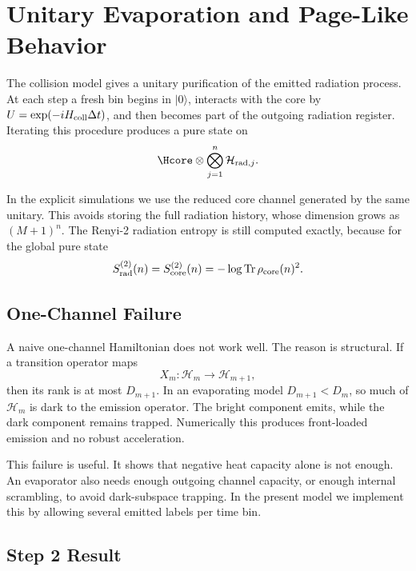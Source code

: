 \section{Unitary Evaporation and Page-Like Behavior}

The collision model gives a unitary purification of the emitted radiation process. At each step a fresh bin begins in $|0\rangle$, interacts with the core by $U=\exp(-iH_{\rm coll}\Delta t)$, and then becomes part of the outgoing radiation register. Iterating this procedure produces a pure state on
\begin{equation}
  \Hcore\otimes \bigotimes_{j=1}^{n}\mathcal{H}_{{\rm rad},j}.
\end{equation}

In the explicit simulations we use the reduced core channel generated by the same unitary. This avoids storing the full radiation history, whose dimension grows as $(M+1)^n$. The Renyi-2 radiation entropy is still computed exactly, because for the global pure state
\begin{equation}
  S^{(2)}_{\rm rad}(n)
  =
  S^{(2)}_{\rm core}(n)
  =
  -\log {\rm Tr}\,\rho_{\rm core}(n)^2.
\end{equation}

\subsection{One-Channel Failure}

A naive one-channel Hamiltonian does not work well. The reason is structural. If a transition operator maps
\begin{equation}
  X_m:\mathcal{H}_m\rightarrow\mathcal{H}_{m+1},
\end{equation}
then its rank is at most $D_{m+1}$. In an evaporating model $D_{m+1}<D_m$, so much of $\mathcal{H}_m$ is dark to the emission operator. The bright component emits, while the dark component remains trapped. Numerically this produces front-loaded emission and no robust acceleration.

This failure is useful. It shows that negative heat capacity alone is not enough. An evaporator also needs enough outgoing channel capacity, or enough internal scrambling, to avoid dark-subspace trapping. In the present model we implement this by allowing several emitted labels per time bin.

\subsection{Step 2 Result}

